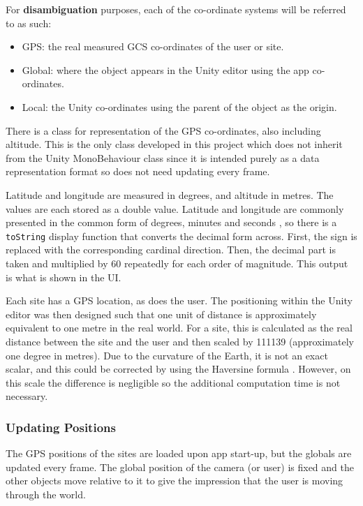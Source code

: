 \documentclass[12pt, a4paper]{article}
\begin{document}
\newpage
For \textbf{disambiguation} purposes, each of the co-ordinate systems will be referred to as such:
\begin{itemize}
    \item GPS: the real measured GCS co-ordinates of the user or site.
    \item Global: where the object appears in the Unity editor using the app co-ordinates.
    \item Local: the Unity co-ordinates using the parent of the object as the origin.
\end{itemize}

There is a class for representation of the GPS co-ordinates, also including altitude. This is the only class developed in this project which does not inherit from the Unity MonoBehaviour class since it is intended purely as a data representation format so does not need updating every frame. 

Latitude and longitude are measured in degrees, and altitude in metres. The values are each stored as a double value. Latitude and longitude are commonly presented in the common form of degrees, minutes and seconds \cite{movement:latitudelongitude}, so there is a \verb|toString| display function that converts the decimal form across. First, the sign is replaced with the corresponding cardinal direction. Then, the decimal part is taken and multiplied by 60 repeatedly for each order of magnitude. This output is what is shown in the UI.

Each site has a GPS location, as does the user. The positioning within the Unity editor was then designed such that one unit of distance is approximately equivalent to one metre in the real world. For a site, this is calculated as the real distance between the site and the user and then scaled by 111139 (approximately one degree in metres). Due to the curvature of the Earth, it is not an exact scalar, and this could be corrected by using the Haversine formula \cite{movement:haversine}. However, on this scale the difference is negligible so the additional computation time is not necessary.

\subsubsection{Updating Positions}
The GPS positions of the sites are loaded upon app start-up, but the globals are updated every frame. The global position of the camera (or user) is fixed and the other objects move relative to it to give the impression that the user is moving through the world. 
\end{document}
